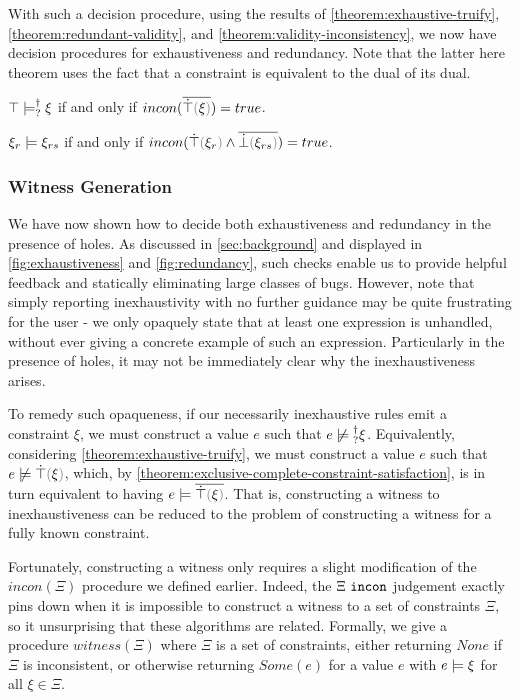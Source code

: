 With such a decision procedure, using the results of \autoref{theorem:exhaustive-truify},  \autoref{theorem:redundant-validity}, and \autoref{theorem:validity-inconsistency}, we now have decision procedures for exhaustiveness and redundancy. Note that the latter here theorem uses the fact that a constraint is equivalent to the dual of its dual.
\begin{theorem}
$\top \models_{?}^{\dag} \xi$ if and only if $incon(\cdual{\ctruify{\xi}}) = true$.
\end{theorem}
\begin{theorem}
$\xi_r \models \xi_{rs}$ if and only if $incon(\cand{\ctruify{\xi_r}}{\cdual{\cfalsify{\xi_{rs}}}})  = true$.
\end{theorem}

\subsubsection{Witness Generation}
We have now shown how to decide both exhaustiveness and redundancy in the presence of holes. As discussed in \autoref{sec:background} and displayed in \autoref{fig:exhaustiveness} and \autoref{fig:redundancy}, such checks enable us to provide helpful feedback and statically eliminating large classes of bugs. However, note that simply reporting inexhaustivity with no further guidance may be quite frustrating for the user - we only opaquely state that at least one expression is unhandled, without ever giving a concrete example of such an expression. Particularly in the presence of holes, it may not be immediately clear why the inexhaustiveness arises.

To remedy such opaqueness, if our necessarily inexhaustive rules emit a constraint $\xi$, we must construct a value $e$ such that $\cnotsatisfyormay{e}{\xi}$. Equivalently, considering \autoref{theorem:exhaustive-truify}, we must construct a value $e$ such that $\cnotsatisfy{e}{\ctruify{\xi}}$, which, by \autoref{theorem:exclusive-complete-constraint-satisfaction}, is in turn equivalent to having $\csatisfy{e}{\cdual{\ctruify{\xi}}}$. That is, constructing a witness to inexhaustiveness can be reduced to the problem of constructing a witness for a fully known constraint.

Fortunately, constructing a witness only requires a slight modification of the $incon(\Xi)$ procedure we defined earlier. Indeed, the $\Xi ~\mathtt{incon}$ judgement exactly pins down when it is impossible to construct a witness to a set of constraints $\Xi$, so it unsurprising that these algorithms are related. Formally, we give a procedure $witness(\Xi)$ where $\Xi$ is a set of constraints, either returning $None$ if $\Xi$ is inconsistent, or otherwise returning $Some(e)$ for a value $e$ with $e \models \xi$ for all $\xi \in \Xi$. 

